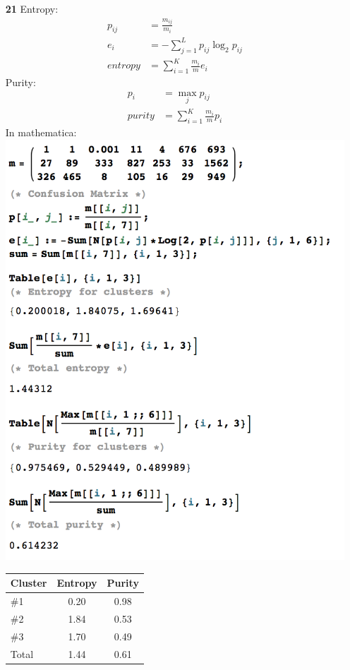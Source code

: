 \documentclass[12pt]{report}
\begin{document}
\begin{enumerate}
	\item [\textbf{21}]
	Entropy:
	\begin{align*}
	p_{ij} &= \frac{m_{ij}}{m_i}\\
	e_i &= -\sum_{j=1}^L p_{ij} \log_2 p_{ij}\\
	entropy &= \sum_{i=1}^K \frac{m_i}{m}e_i
	\end{align*}
	Purity:
	\begin{align*}
	p_i &= \max_j{p_{ij}}\\
	purity &= \sum_{i=1}^K \frac{m_i}{m} p_i
	\end{align*}
	In mathematica:\\
	\includegraphics[width=\linewidth]{21.png}
	\begin{table}[H]
		\centering
		\begin{tabular}{m{3.5em} cc}
			\toprule
			Cluster & Entropy & Purity \\ \midrule
			\#1     & 0.20    &  0.98  \\ \midrule
			\#2     & 1.84    &  0.53  \\ \midrule
			\#3     & 1.70    &  0.49  \\ \midrule
			Total   & 1.44    &  0.61  \\ \bottomrule
		\end{tabular}
	\end{table}
	

\end{enumerate}
\end{document}
